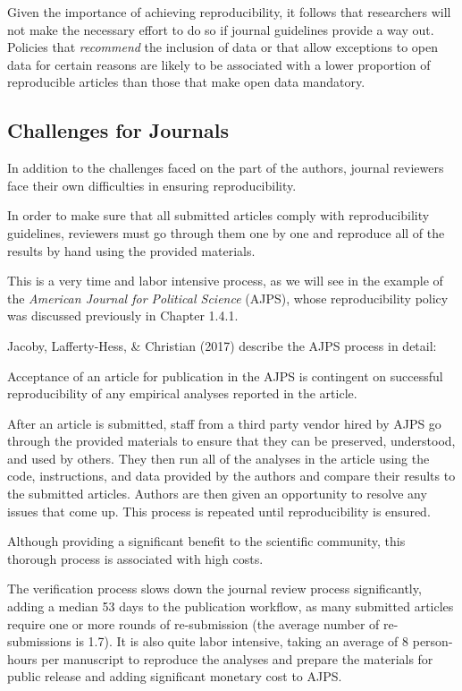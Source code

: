 \documentclass[12pt,twoside]{reedthesis}
\begin{document}
Given the importance of achieving reproducibility, it follows that researchers will not make the necessary effort to do so if journal guidelines provide a way out. Policies that \emph{recommend} the inclusion of data or that allow exceptions to open data for certain reasons are likely to be associated with a lower proportion of reproducible articles than those that make open data mandatory.

\hypertarget{challenges-for-journals}{%
\subsection{Challenges for Journals}\label{challenges-for-journals}}

In addition to the challenges faced on the part of the authors, journal reviewers face their own difficulties in ensuring reproducibility.

In order to make sure that all submitted articles comply with reproducibility guidelines, reviewers must go through them one by one and reproduce all of the results by hand using the provided materials.

This is a very time and labor intensive process, as we will see in the example of the \emph{American Journal for Political Science} (AJPS), whose reproducibility policy was discussed previously in Chapter 1.4.1.

Jacoby, Lafferty-Hess, \& Christian (2017) describe the AJPS process in detail:

Acceptance of an article for publication in the AJPS is contingent on successful reproducibility of any empirical analyses reported in the article.

After an article is submitted, staff from a third party vendor hired by AJPS go through the provided materials to ensure that they can be preserved, understood, and used by others. They then run all of the analyses in the article using the code, instructions, and data provided by the authors and compare their results to the submitted articles. Authors are then given an opportunity to resolve any issues that come up. This process is repeated until reproducibility is ensured.

Although providing a significant benefit to the scientific community, this thorough process is associated with high costs.

The verification process slows down the journal review process significantly, adding a median 53 days to the publication workflow, as many submitted articles require one or more rounds of re-submission (the average number of re-submissions is 1.7). It is also quite labor intensive, taking an average of 8 person-hours per manuscript to reproduce the analyses and prepare the materials for public release and adding significant monetary cost to AJPS.
\end{document}
